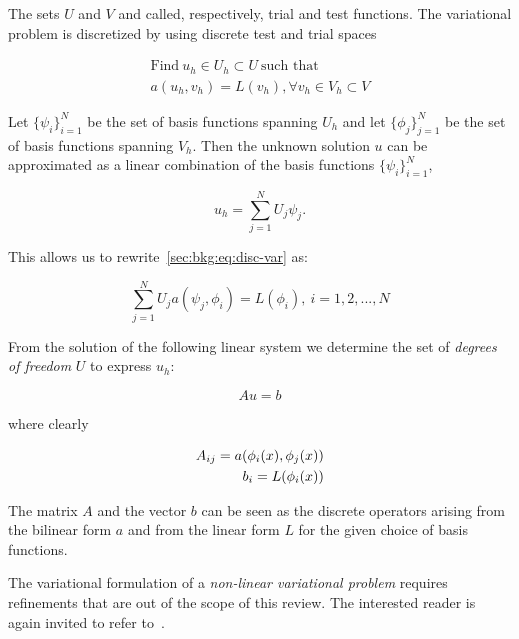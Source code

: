 The sets $U$ and $V$ and called, respectively, trial and test functions. The variational problem is discretized by using discrete test and trial spaces

\begin{equation}
\label{sec:bkg:eq:disc-var}
\begin{split}
\text{Find}\ u_h \in U_h \subset U\ \text{such that} \\
a(u_h, v_h) = L(v_h), \forall v_h \in V_h \subset V
\end{split}
\end{equation}

Let $\lbrace \psi_i \rbrace_{i=1}^N$ be the set of basis functions spanning $U_h$ and let $\lbrace \phi_j \rbrace_{j=1}^{N}$ be the set of basis functions spanning $V_h$. Then the unknown solution $u$ can be approximated as a linear combination of the basis functions $\lbrace \psi_i \rbrace_{i=1}^N$,

\begin{equation}
u_h = \sum_{j=1}^N U_j \psi_j.
\end{equation}

This allows us to rewrite~\ref{sec:bkg:eq:disc-var} as:

\begin{equation}
\sum_{j=1}^N U_j a(\psi_j, \phi_i) = L(\phi_i),\ i=1,2,...,N
\end{equation}

From the solution of the following linear system we determine the set of {\em degrees of freedom} $U$ to express $u_h$:

\begin{equation}
\label{sec:bkg:eq:lin-sys}
Au = b
\end{equation}

where clearly

\begin{equation}
\label{sec:bkg:eq:disc-op}
\centering
\begin{split}
A_{ij} = a(\phi_i(x), \phi_j(x)) \\
b_i = L(\phi_i(x))
\end{split}
\end{equation}

The matrix $A$ and the vector $b$ can be seen as the discrete operators arising from the bilinear form $a$ and from the linear form $L$ for the given choice of basis functions.

The variational formulation of a {\em non-linear variational problem} requires refinements that are out of the scope of this review. The interested reader is again invited to refer to~\cite{brenner-and-scott}.


